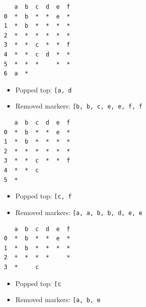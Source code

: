 \documentclass[11pt]{article}
\providecommand{\tightlist}{%
      \setlength{\itemsep}{0pt}\setlength{\parskip}{0pt}}
\begin{document}
\begin{verbatim}
   a  b  c  d  e  f
0  *  b  *  *  e  *
1  *  b  *  *  *  *
2  *  *  *  *  *  *
3  *  *  c  *  *  f
4  *  *  c  d  *  *
5  *  *  *     *  *
6  a  *            
\end{verbatim}

\begin{itemize}
\tightlist
\item
  Popped top:
  \texttt{{[}\textquotesingle{}a\textquotesingle{},\ \textquotesingle{}d\textquotesingle{}{]}}
\item
  Removed markers:
  \texttt{{[}\textquotesingle{}b\textquotesingle{},\ \textquotesingle{}b\textquotesingle{},\ \textquotesingle{}c\textquotesingle{},\ \textquotesingle{}e\textquotesingle{},\ \textquotesingle{}e\textquotesingle{},\ \textquotesingle{}f\textquotesingle{},\ \textquotesingle{}f\textquotesingle{}{]}}
\end{itemize}

\begin{verbatim}
   a  b  c  d  e  f
0  *  b  *  *  e  *
1  *  b  *  *  *  *
2  *  *  *  *  *  *
3  *  *  c  *  *  f
4  *  *  c         
5  *               
\end{verbatim}

\begin{itemize}
\tightlist
\item
  Popped top:
  \texttt{{[}\textquotesingle{}c\textquotesingle{},\ \textquotesingle{}f\textquotesingle{}{]}}
\item
  Removed markers:
  \texttt{{[}\textquotesingle{}a\textquotesingle{},\ \textquotesingle{}a\textquotesingle{},\ \textquotesingle{}b\textquotesingle{},\ \textquotesingle{}b\textquotesingle{},\ \textquotesingle{}d\textquotesingle{},\ \textquotesingle{}e\textquotesingle{},\ \textquotesingle{}e\textquotesingle{}{]}}
\end{itemize}

\begin{verbatim}
   a  b  c  d  e  f
0  *  b  *  *  e  *
1  *  b  *  *  *  *
2  *  *  *  *     *
3  *     c         
\end{verbatim}

\begin{itemize}
\tightlist
\item
  Popped top: \texttt{{[}\textquotesingle{}c\textquotesingle{}{]}}
\item
  Removed markers:
  \texttt{{[}\textquotesingle{}a\textquotesingle{},\ \textquotesingle{}b\textquotesingle{},\ \textquotesingle{}e\textquotesingle{}{]}}
\end{itemize}
\end{document}
